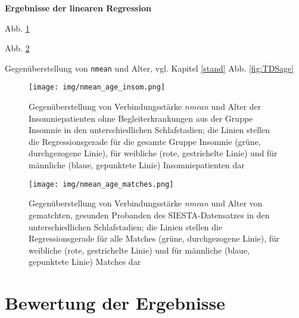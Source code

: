 \newpage


\textbf{Ergebnisse der linearen Regression}



Abb. \ref{fig:nmean_age_insom}

Abb. \ref{fig:nmean_age_matches}

Gegenüberstellung von \texttt{nmean} und Alter, vgl. Kapitel \ref{stand} Abb. \ref{fig:TDSage}





\begin{figure}[H]
	\centering
	\texttt{[image: img/nmean\_age\_insom.png]}
	\caption[Gegenüberstellung von Verbindungsstärke \textit{nmean} und Alter von Insomniepatienten ohne Begleiterkrankungen]{Gegenüberstellung von Verbindungsstärke \textit{nmean} und Alter der Insomniepatienten ohne Begleiterkrankungen aus der Gruppe Insomnie in den unterschiedlichen Schlafstadien; die Linien stellen die Regressionsgerade für die gesamte Gruppe Insomnie (grüne, durchgezogene Linie), für weibliche (rote, gestrichelte Linie) und für männliche (blaue, gepunktete Linie) Insomniepatienten dar}
	\label{fig:nmean_age_insom}
\end{figure}



\begin{figure}[H]
	\centering
	\texttt{[image: img/nmean\_age\_matches.png]}
	\caption[Gegenüberstellung von Verbindungsstärke \textit{nmean} und Alter von gematchten, gesunden Probanden]{Gegenüberstellung von Verbindungsstärke \textit{nmean} und Alter von gematchten, gesunden Probanden des SIESTA-Datensatzes in den unterschiedlichen Schlafstadien; die Linien stellen die Regressionsgerade für alle Matches (grüne, durchgezogene Linie), für weibliche (rote, gestrichelte Linie) und für männliche (blaue, gepunktete Linie) Matches dar}
	\label{fig:nmean_age_matches}
\end{figure}













\section{Bewertung der Ergebnisse}


